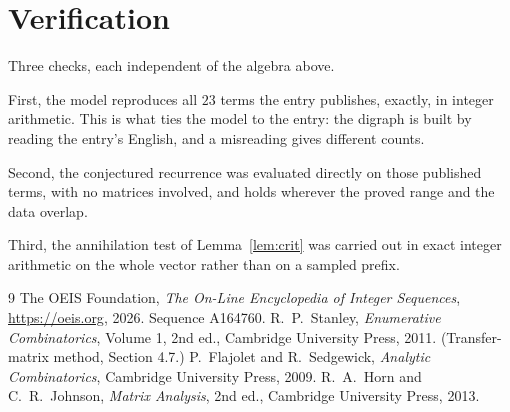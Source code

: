 \documentclass[11pt,a4paper]{article}
\theoremstyle{plain}
\theoremstyle{definition}
\begin{document}
\section{Verification}

Three checks, each independent of the algebra above.

First, the model reproduces all $23$ terms the entry publishes, exactly, in integer
arithmetic. This is what ties the model to the entry: the digraph is built by reading the
entry's English, and a misreading gives different counts.

Second, the conjectured recurrence was evaluated directly on those published terms, with no
matrices involved, and holds wherever the proved range and the data overlap.

Third, the annihilation test of Lemma~\ref{lem:crit} was carried out in exact integer
arithmetic on the whole vector rather than on a sampled prefix.

\begin{thebibliography}{9}
 The OEIS Foundation, \emph{The On-Line Encyclopedia of Integer
Sequences}, \url{https://oeis.org}, 2026. Sequence A164760.
 R.~P.~Stanley, \emph{Enumerative Combinatorics}, Volume 1, 2nd ed.,
Cambridge University Press, 2011. (Transfer-matrix method, Section 4.7.)
 P.~Flajolet and R.~Sedgewick, \emph{Analytic Combinatorics}, Cambridge
University Press, 2009.
 R.~A.~Horn and C.~R.~Johnson, \emph{Matrix Analysis}, 2nd ed., Cambridge
University Press, 2013.
\end{thebibliography}
\end{document}
